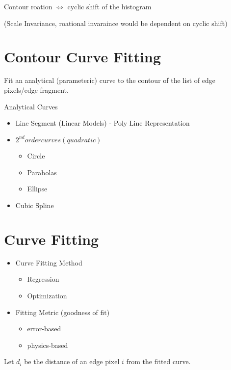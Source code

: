 \documentclass[11pt]{article}
\theoremstyle{definition}
\begin{document}
Contour roation $\iff$ cyclic shift of the histogram

(Scale Invariance, roational invaraince would be dependent on cyclic shift)


\newpage
\pagestyle{fancy}  %

\section{Contour Curve Fitting}

Fit an analytical (parameteric) curve to the contour of the list of edge pixels/edge fragment.

Analytical Curves

\begin{itemize}
    \item Line Segment (Linear Models) - Poly Line Representation
    \item $2^{nd} order curves (quadratic)$
    \begin{itemize}
        \item[-] Circle
        \item[-] Parabolas 
        \item[-] Ellipse 
    \end{itemize}
    \item Cubic Spline
\end{itemize}

\section{Curve Fitting}

\begin{itemize}
    \item Curve Fitting Method
    \begin{itemize}
        \item[-] Regression
        \item[-] Optimization
    \end{itemize}
    \item Fitting Metric (goodness of fit)
    \begin{itemize}
        \item error-based
        \item physics-based
    \end{itemize}
\end{itemize}

Let $d_i$ be the distance of an edge pixel $i$ from the fitted curve.
\end{document}
